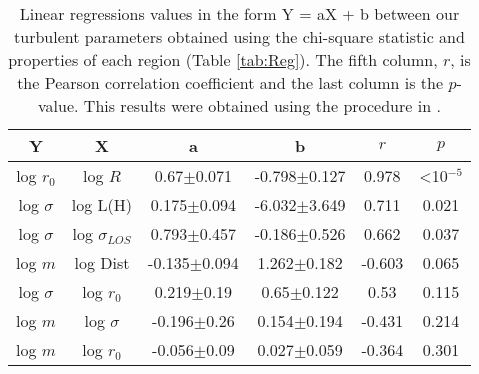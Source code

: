 \begin{table*}
\begin{center}
\caption{Linear regressions values in the form Y = aX + b between our turbulent parameters obtained using the chi-square statistic and properties of each region (Table \ref{tab:Reg}). The fifth column, $r$, is the Pearson correlation coefficient and the last column is the $p$-value. This results were obtained using the procedure in \citet{2007ApJ...665.1489K}.}
\begin{tabular}{cccccc}
\hline
            Y &                   X &                 a &                 b &       $r$ &      $p$ \\
\hline
    log $r_0$ &             log $R$ &    0.67$\pm$0.071 &  -0.798$\pm$0.127 &   0.978 &   <10\(^{-5}\) \\
 log $\sigma$ &            log L(H) &   0.175$\pm$0.094 &  -6.032$\pm$3.649 &   0.711 &  0.021 \\
 log $\sigma$ &  log $\sigma_{LOS}$ &   0.793$\pm$0.457 &  -0.186$\pm$0.526 &   0.662 &  0.037 \\
      log $m$ &            log Dist &  -0.135$\pm$0.094 &   1.262$\pm$0.182 &  -0.603 &  0.065 \\
 log $\sigma$ &         log $r_{0}$ &    0.219$\pm$0.19 &    0.65$\pm$0.122 &    0.53 &  0.115 \\
      log $m$ &        log $\sigma$ &   -0.196$\pm$0.26 &   0.154$\pm$0.194 &  -0.431 &  0.214 \\
      log $m$ &         log $r_{0}$ &   -0.056$\pm$0.09 &   0.027$\pm$0.059 &  -0.364 &  0.301 \\
\hline
\end{tabular}\label{tab:RestStats}
\end{center}
\end{table*}


